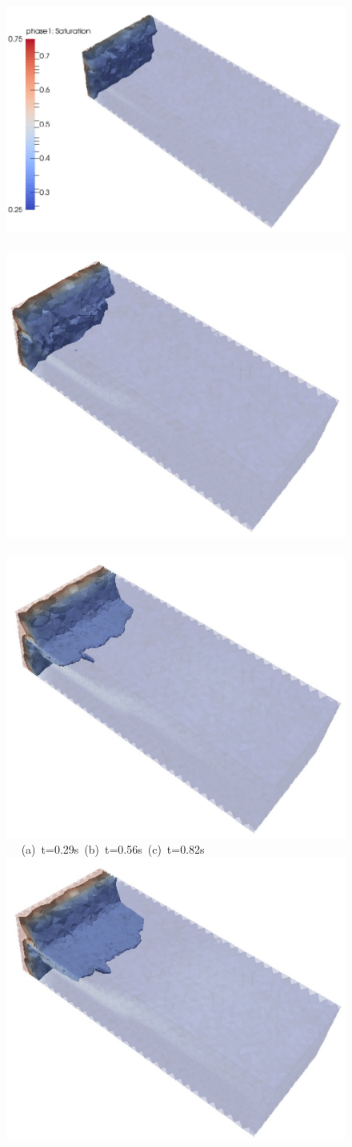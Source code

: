 \begin{landscape}
  \begin{figure}[ht]
  \vbox{\vspace{-.5cm}
      \hbox{\includegraphics[width=.55\textwidth, height=.45\textwidth]{./Pics1/3D_Channel/3D_Channel_Saturation1Isosurface_D30c} 
            \includegraphics[width=.5\textwidth]{./Pics1/3D_Channel/3D_Channel_Saturation1Isosurface_D60c}
            \includegraphics[width=.5\textwidth]{./Pics1/3D_Channel/3D_Channel_Saturation1Isosurface_D90c} }
      \hbox{\hspace{2.0cm} (a) t=0.29s \hspace{6.cm} (b) t=0.56s \hspace{4.cm} (c) t=0.82s}
      \vspace{0.5cm}
      \hbox{\hspace{.5cm} \includegraphics[width=.45\textwidth]{./Pics1/3D_Channel/3D_Channel_Saturation1Isosurface_D110c}
}}
\end{figure}
\end{landscape}
